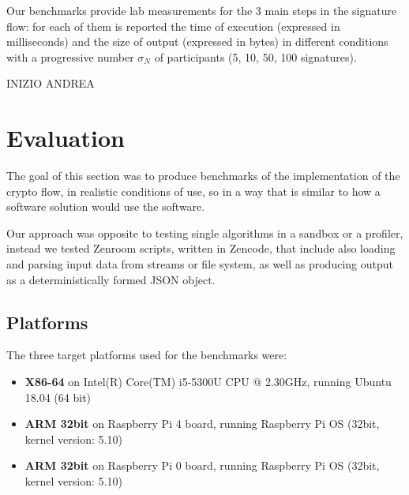 \documentclass[twocolumn]{article}
\begin{document}
Our benchmarks provide lab measurements for the 3 main steps in the signature flow: for each of them is reported the time of execution (expressed in milliseconds) and the size of output (expressed in bytes) in different conditions with a progressive number $\sigma_N$ of participants (5, 10, 50, 100 signatures).




INIZIO ANDREA

\section{Evaluation}
\label{sec:evaluation}



The goal of this section was to produce benchmarks of the implementation of the crypto flow, in  realistic conditions of use, so in a way that is similar to how a software solution would use the software. 

Our approach was opposite to testing single algorithms in a sandbox or a profiler, instead we tested Zenroom scripts, written in Zencode, that include also loading and parsing input data from streams or file system, as well as producing output as a deterministically formed JSON object. 

\subsection*{Platforms}
The three target platforms used for the benchmarks were: 
\begin{itemize}
  \item   \textbf{X86-64} on Intel(R) Core(TM) i5-5300U CPU @ 2.30GHz, running Ubuntu 18.04 (64 bit)
  \item   \textbf{ARM 32bit} on Raspberry Pi 4 board, running Raspberry Pi OS (32bit, kernel version: 5.10)
  \item  \textbf{ARM 32bit} on Raspberry Pi 0 board, running Raspberry Pi OS (32bit, kernel version: 5.10)
\end{itemize}
\end{document}

